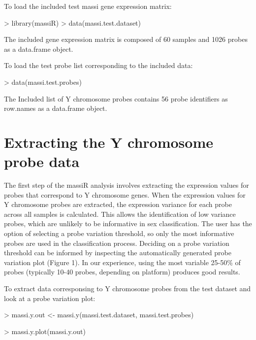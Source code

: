 \documentclass{article}
\begin{document}
To load the included test massi gene expression matrix:
\begin{Schunk}
\begin{Sinput}
> library(massiR)
> data(massi.test.dataset)
\end{Sinput}
\end{Schunk}
The included gene expression matrix is composed of 60 samples and 1026 probes as a data.frame object.

To load the test probe list corresponding to the included data:
\begin{Schunk}
\begin{Sinput}
> data(massi.test.probes)
\end{Sinput}
\end{Schunk}
The Included list of Y chromosome probes contains 56 probe identifiers as row.names as a data.frame object.

\section{Extracting the Y chromosome probe data}
The first step of the massiR analysis involves extracting the expression values for probes that correspond to Y chromosome genes. When the expression values for Y chromosome probes are extracted, the expression variance for each probe across all samples is calculated. This allows the identification of low variance probes, which are unlikely to be informative in sex classification. The user has the option of selecting a probe variation threshold, so only the most informative probes are used in the classification process. Deciding on a probe variation threshold can be informed by inspecting the automatically generated probe variation plot (Figure 1). In our experience, using the most variable 25-50\% of probes (typically 10-40 probes, depending on platform) produces good results. 

To extract data corresponsing to Y chromosome probes from the test dataset and look at a probe variation plot:

\begin{Schunk}
\begin{Sinput}
> massi.y.out <- massi.y(massi.test.dataset, massi.test.probes)
\end{Sinput}
\end{Schunk}

\begin{Schunk}
\begin{Sinput}
> massi.y.plot(massi.y.out)
\end{Sinput}
\end{Schunk}
\end{document}
